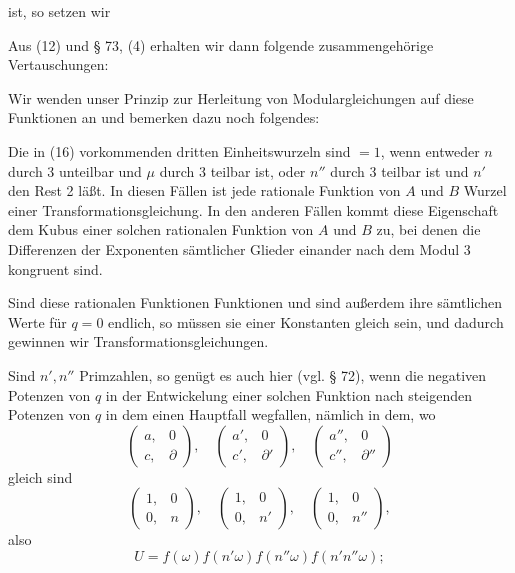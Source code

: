 ist, so setzen wir

Aus (12) und § 73, (4) erhalten wir dann folgende zusammengehörige
Vertauschungen:

Wir wenden unser Prinzip zur Herleitung von Modulargleichungen auf
diese Funktionen an und bemerken dazu noch folgendes:

Die in (16) vorkommenden dritten Einheitswurzeln sind $=1$, wenn
entweder $n$ durch 3 unteilbar und $\mu$ durch 3 teilbar ist, oder $n''$
durch 3 teilbar ist und $n'$ den Rest 2 läßt. In diesen Fällen ist jede
rationale Funktion von $A$ und $B$ Wurzel einer Transformationsgleichung.
In den anderen Fällen kommt diese Eigenschaft dem Kubus einer solchen
rationalen Funktion von $A$ und $B$ zu, bei denen die Differenzen der
Exponenten sämtlicher Glieder einander nach dem Modul 3 kongruent sind.

Sind diese rationalen Funktionen  Funktionen und sind
außerdem ihre sämtlichen Werte für $q = 0$ endlich, so müssen sie einer
Konstanten gleich sein, und dadurch gewinnen wir Transformationsgleichungen.

Sind $n', n''$ Primzahlen, so genügt es auch hier (vgl. § 72), wenn die
negativen Potenzen von $q$ in der Entwickelung einer solchen Funktion
nach steigenden Potenzen von $q$ in dem einen Hauptfall wegfallen,
nämlich in dem, wo
\[
\begin{pmatrix} a, & 0 \\ c, & \partial \end{pmatrix}, \quad
\begin{pmatrix} a', & 0 \\ c', & \partial' \end{pmatrix}, \quad
\begin{pmatrix} a'', & 0 \\ c'', & \partial'' \end{pmatrix}
\]
gleich sind
\[
\begin{pmatrix} 1, & 0 \\ 0, & n \end{pmatrix}, \quad
\begin{pmatrix} 1, & 0 \\ 0, & n' \end{pmatrix}, \quad
\begin{pmatrix} 1, & 0 \\ 0, & n'' \end{pmatrix},
\]
also
\[
U = f(\omega)f(n'\omega)f(n''\omega)f(n'n''\omega);
\]
